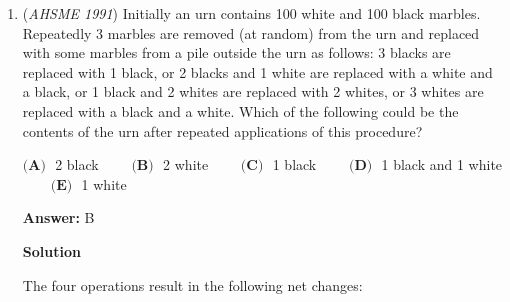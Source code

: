 \begin{enumerate}
We rationalize the denominator in the given equation, then solve for $x:$
 \begin{align*} x+\sqrt{x^2-1}+\frac{x+\sqrt{x^2-1}}{\left(x-\sqrt{x^2-1}\right)\left(x+\sqrt{x^2-1}\right)} &= 20 \\ x+\sqrt{x^2-1}+x+\sqrt{x^2-1} &= 20 \\ x+\sqrt{x^2-1} &= 10 \\ \sqrt{x^2-1} &= 10-x \\ x^2-1 &= 100-20x+x^2 \\ 20x &= 101 \\ x &= 5.05. \end{align*}
We rationalize the denominator in the requested expression, then simplify the result:
 \begin{align*} x^2+\sqrt{x^4-1}+\frac{1}{x^2+\sqrt{x^4-1}} &= x^2+\sqrt{x^4-1}+\frac{x^2-\sqrt{x^4-1}}{\left(x^2+\sqrt{x^4-1}\right)\left(x^2-\sqrt{x^4-1}\right)} \\ &= x^2+\sqrt{x^4-1}+x^2-\sqrt{x^4-1} \\ &= 2x^2 \\ &= \boxed{\textbf{(C) } 51.005}. \end{align*}




	\item (\textit{AHSME 1991}) Initially an urn contains 100 white and 100 black marbles. Repeatedly 3 marbles are removed (at random) from the urn and replaced with some marbles from a pile outside the urn as follows: 3 blacks are replaced with 1 black, or 2 blacks and 1 white are replaced with a white and a black, or 1 black and 2 whites are replaced with 2 whites, or 3 whites are replaced with a black and a white. Which of the following could be the contents of the urn after repeated applications of this procedure?


 $\textbf{(A) }$ 2 black $\qquad \textbf{(B) }$ 2 white $\qquad \textbf{(C) }$ 1 black $\qquad \textbf{(D) }$ 1 black and 1 white $\qquad \textbf{(E) }$ 1 white


 
 \textbf{Answer: }B



\textbf{Solution}

The four operations result in the following net changes:


\end{enumerate}

